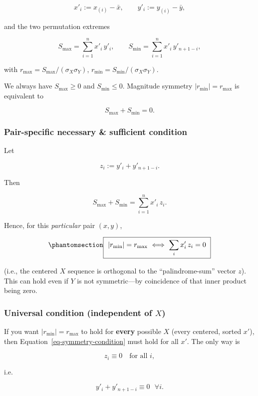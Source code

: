 \documentclass[
  12pt,
]{article}
\theoremstyle{plain}
\theoremstyle{definition}
\theoremstyle{remark}
\begin{document}
\[x'_i:=x_{(i)}-\bar x,\qquad y'_i:=y_{(i)}-\bar y,\]

and the two permutation extremes

\[S_{\max}=\sum_{i=1}^n x'_i\,y'_i,\qquad  
S_{\min}=\sum_{i=1}^n x'_i\,y'_{n+1-i},\]

with \(r_{\max}=S_{\max}/(\sigma_X\sigma_Y)\),
\(r_{\min}=S_{\min}/(\sigma_X\sigma_Y)\).

We always have \(S_{\max}\ge 0\) and \(S_{\min}\le 0\). Magnitude
symmetry \(|r_{\min}|=r_{\max}\) is equivalent to

\[S_{\max}+S_{\min}=0.\]

\subsubsection{Pair-specific necessary \& sufficient
condition}\label{pair-specific-necessary-sufficient-condition}

Let

\[z_i := y'_i + y'_{n+1-i}.\]

Then

\[S_{\max}+S_{\min}=\sum_{i=1}^n x'_i\,z_i.\]

Hence, for this \emph{particular} pair \((x,y)\),

\begin{equation}\phantomsection\label{eq-symmetry-condition}{\boxed{\ |r_{\min}|=r_{\max}\ \Longleftrightarrow\ \sum_i x'_i\,z_i=0\ }}\end{equation}

(i.e., the centered \(X\) sequence is orthogonal to the
``palindrome-sum'' vector \(z\)).\\
This can hold even if \(Y\) is not symmetric---by coincidence of that
inner product being zero.

\subsubsection{\texorpdfstring{Universal condition (independent of
\(X\))}{Universal condition (independent of X)}}\label{universal-condition-independent-of-x}

If you want \(|r_{\min}|=r_{\max}\) to hold for \textbf{every} possible
\(X\) (every centered, sorted \(x'\)), then
Equation~\ref{eq-symmetry-condition} must hold for all \(x'\). The only
way is

\[z_i \equiv 0\quad\text{for all }i,\]

i.e.

\[y'_i + y'_{n+1-i}\equiv 0\ \ \ \forall i.\]
\end{document}
